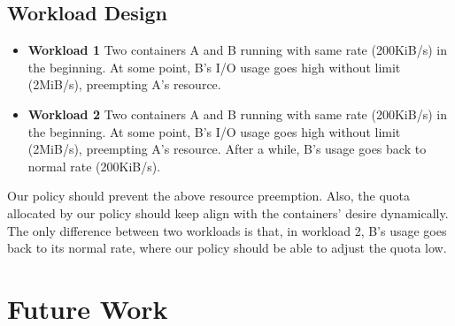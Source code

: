\documentclass[10pt, conference,compsoc]{IEEEtran}
\begin{document}
\subsection{Workload Design}

\begin{itemize}
  \item \textbf{Workload 1} Two containers A and B running with same rate (200KiB/s) in the beginning. At some point, B's I/O usage goes high without limit (2MiB/s), preempting A's resource.
  \item \textbf{Workload 2} Two containers A and B running with same rate (200KiB/s) in the beginning. At some point, B's I/O usage goes high without limit (2MiB/s), preempting A's resource. After a while, B's usage goes back to normal rate (200KiB/s).
\end{itemize}

Our policy should prevent the above resource preemption. Also, the quota allocated by our policy should keep align with the containers' desire dynamically. The only difference between two workloads is that, in workload 2, B's usage goes back to its normal rate, where our policy should be able to adjust the quota low. \\



\section{Future Work}

\end{document}

